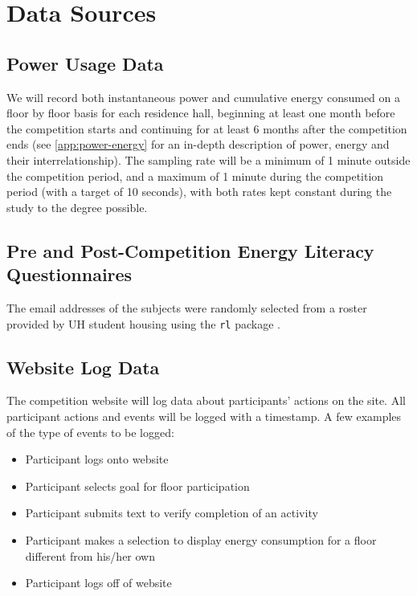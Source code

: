 \section{Data Sources}

\subsection{Power Usage Data}
\label{sec:power-usage-data}

We will record both instantaneous power and cumulative energy consumed on a floor by floor basis for each residence hall, beginning at least one month before the competition starts and continuing for at least 6 months after the competition ends (see \autoref{app:power-energy} for an in-depth description of power, energy and their interrelationship). The sampling rate will be a minimum of 1 minute outside the competition period, and a maximum of 1 minute during the competition period (with a target of 10 seconds), with both rates kept constant during the study to the degree possible.

\subsection{Pre and Post-Competition Energy Literacy Questionnaires}
\label{sec:exp-literacy-questionnaire}

The email addresses of the subjects were randomly selected from a roster provided by UH \Manoa student housing using the \texttt{rl} package \cite{rl-website}. 

\subsection{Website Log Data}

The competition website will log data about participants' actions on the site. All participant actions and events will be logged with a timestamp. A few examples of the type of events to be logged:

\begin{itemize}
\item Participant logs onto website
\item Participant selects goal for floor participation
\item Participant submits text to verify completion of an activity
\item Participant makes a selection to display energy consumption for a floor different from his/her own
\item Participant logs off of website
\end{itemize}

